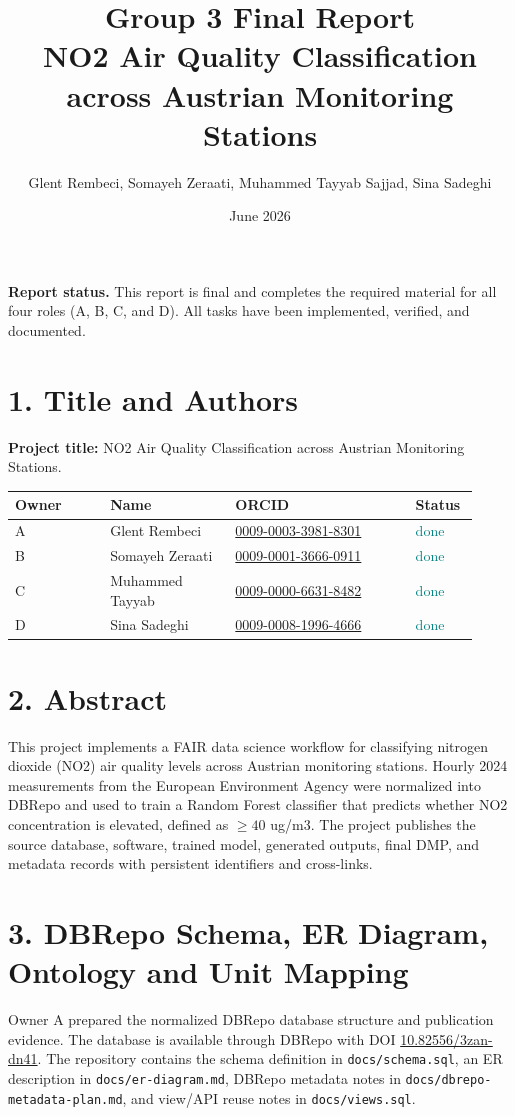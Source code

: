 \documentclass[10pt,a4paper]{article}
\title{Group 3 Final Report\\NO2 Air Quality Classification across Austrian Monitoring Stations}
\author{Glent Rembeci, Somayeh Zeraati, Muhammed Tayyab Sajjad, Sina Sadeghi}
\date{June 2026}
\newcommand{\done}{\textcolor{teal}{done}}
\begin{document}
\maketitle

\textbf{Report status.} This report is final and completes the required material for all four roles (A, B, C, and D). All tasks have been implemented, verified, and documented.

\section*{1. Title and Authors}
\textbf{Project title:} NO2 Air Quality Classification across Austrian Monitoring Stations.

\noindent\begin{tabular}{p{0.19\linewidth}p{0.25\linewidth}p{0.36\linewidth}p{0.12\linewidth}}
\toprule
Owner & Name & ORCID & Status \\
\midrule
A & Glent Rembeci & \href{https://orcid.org/0009-0003-3981-8301}{0009-0003-3981-8301} & \done \\
B & Somayeh Zeraati & \href{https://orcid.org/0009-0001-3666-0911}{0009-0001-3666-0911} & \done \\
C & Muhammed Tayyab & \href{https://orcid.org/0009-0000-6631-8482}{0009-0000-6631-8482} & \done \\
D & Sina Sadeghi & \href{https://orcid.org/0009-0008-1996-4666}{0009-0008-1996-4666} & \done \\
\bottomrule
\end{tabular}

\section*{2. Abstract}
This project implements a FAIR data science workflow for classifying nitrogen
dioxide (NO2) air quality levels across Austrian monitoring stations. Hourly 2024
measurements from the European Environment Agency were normalized into DBRepo and
used to train a Random Forest classifier that predicts whether NO2 concentration
is elevated, defined as \(\geq 40\) ug/m3. The project publishes the source
database, software, trained model, generated outputs, final DMP, and metadata
records with persistent identifiers and cross-links.

\section*{3. DBRepo Schema, ER Diagram, Ontology and Unit Mapping}
Owner A prepared the normalized DBRepo database structure and publication
evidence. The database is available through DBRepo with DOI
\href{https://doi.org/10.82556/3zan-dn41}{10.82556/3zan-dn41}. The repository
contains the schema definition in \texttt{docs/schema.sql}, an ER description in
\texttt{docs/er-diagram.md}, DBRepo metadata notes in
\texttt{docs/dbrepo-metadata-plan.md}, and view/API reuse notes in
\texttt{docs/views.sql}.
\end{document}
